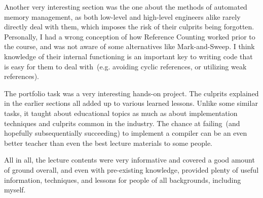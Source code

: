 \documentclass[]{tukportfolio}
\begin{document}
Another very interesting section was the one about the methods of automated memory management, as both low-level and high-level engineers alike rarely directly deal with them, which imposes the risk of their culprits being forgotten. Personally, I had a wrong conception of how Reference Counting worked prior to the course, and was not aware of some alternatives like Mark-and-Sweep. I think knowledge of their internal functioning is an important key to writing code that is easy for them to deal with~(e.g. avoiding cyclic references, or utilizing weak references).

The portfolio task was a very interesting hands-on project. The culprits explained in the earlier sections all added up to various learned lessons. Unlike some similar tasks, it taught about educational topics as much as about implementation techniques and culprits common in the industry. The chance at failing~(and hopefully subsequentially succeeding) to implement a compiler can be an even better teacher than even the best lecture materials to some people.

All in all, the lecture contents were very informative and covered a good amount of ground overall, and even with pre-existing knowledge, provided plenty of useful information, techniques, and lessons for people of all backgrounds, including myself.

\newpage
\nocite{*}


\end{document}
